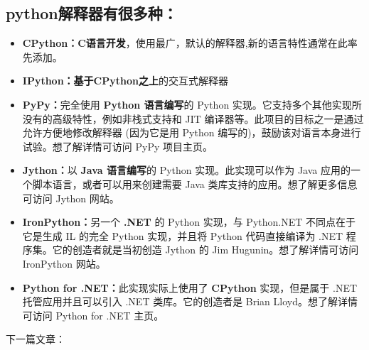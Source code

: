 \subsection{python解释器有很多种：}

\begin{itemize}
\item \textbf{CPython：}\textbf{C语言开发}，使用最广，默认的解释器,新的语言特性通常在此率先添加。

\item \textbf{IPython：}\textbf{基于CPython之上}的交互式解释器

\item \textbf{PyPy：}完全使用 \textbf{Python 语言编写}的 Python 实现。它支持多个其他实现所没有的高级特性，例如非栈式支持和 JIT 编译器等。此项目的目标之一是通过允许方便地修改解释器 (因为它是用 Python 编写的)，鼓励该对语言本身进行试验。想了解详情可访问 PyPy 项目主页。

\item \textbf{Jython：}以 \textbf{Java 语言编写}的 Python 实现。此实现可以作为 Java 应用的一个脚本语言，或者可以用来创建需要 Java 类库支持的应用。想了解更多信息可访问 Jython 网站。

\item \textbf{IronPython：}另一个 \textbf{.NET} 的 Python 实现，与 Python.NET 不同点在于它是生成 IL 的完全 Python 实现，并且将 Python 代码直接编译为 .NET 程序集。它的创造者就是当初创造 Jython 的 Jim Hugunin。想了解详情可访问 IronPython 网站。

\item \textbf{Python for .NET：}此实现实际上使用了 \textbf{CPython} 实现，但是属于 .NET 托管应用并且可以引入 .NET 类库。它的创造者是 Brian Lloyd。想了解详情可访问 Python for .NET 主页。
\end{itemize}

下一篇文章：
